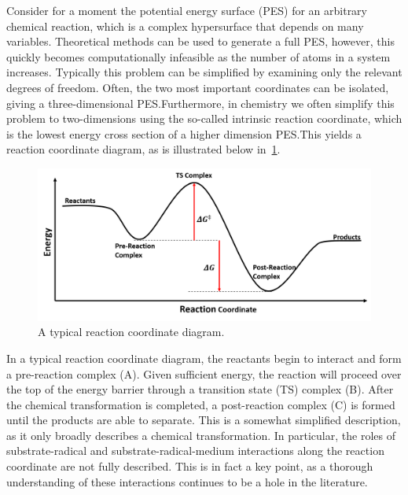 Consider for a moment the potential energy surface (PES) for an arbitrary chemical reaction, which is a complex hypersurface that depends on many variables. Theoretical methods can be used to generate a full PES, however, this quickly becomes computationally infeasible as the number of atoms in a system increases. Typically this problem can be simplified by examining only the relevant degrees of freedom. Often, the two most important coordinates can be isolated, giving a three-dimensional PES.\@ Furthermore, in chemistry we often simplify this problem to two-dimensions using the so-called intrinsic reaction coordinate, which is the lowest energy cross section of a higher dimension PES.\@ This yields a reaction coordinate diagram, as is illustrated below in~\ref{fig:pes}.

\begin{figure}[htb]
  \centering
  \includegraphics[width=\textwidth]{figures/pes}
  \caption[A typical reaction coordinate diagram.]{A typical reaction coordinate diagram.}
\label{fig:pes}
\end{figure}

In a typical reaction coordinate diagram, the reactants begin to interact and form a pre-reaction complex (A). Given sufficient energy, the reaction will proceed over the top of the energy barrier through a transition state (TS) complex (B). After the chemical transformation is completed, a post-reaction complex (C) is formed until the products are able to separate. This is a somewhat simplified description, as it only broadly describes a chemical transformation. In particular, the roles of substrate-radical and substrate-radical-medium interactions along the reaction coordinate are not fully described. This is in fact a key point, as a thorough understanding of these interactions continues to be a hole in the literature.

